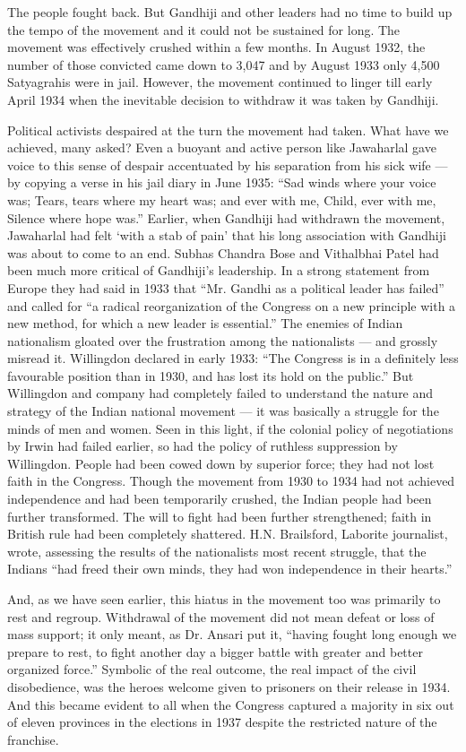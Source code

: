 \begin{multicols}{2}
The people fought back. But Gandhiji and other leaders had no time to build up the tempo of the movement and it could not be sustained for long. The movement was effectively crushed within a few months. In August 1932, the number of those convicted came down to 3,047 and by August 1933 only 4,500 Satyagrahis were in jail. However, the movement continued to linger till early April 1934 when the inevitable decision to withdraw it was taken by Gandhiji.

Political activists despaired at the turn the movement had taken. What have we achieved, many asked? Even a buoyant and active person like Jawaharlal gave voice to this sense of despair accentuated by his separation from his sick wife --- by copying a verse in his jail diary in June 1935: ``Sad winds where your voice was; Tears, tears where my heart was; and ever with me, Child, ever with me, Silence where hope was.'' Earlier, when Gandhiji had withdrawn the movement, Jawaharlal had felt `with a stab of pain' that his long association with Gandhiji was about to come to an end. Subhas Chandra Bose and Vithalbhai Patel had been much more critical of Gandhiji's leadership. In a strong statement from Europe they had said in 1933 that ``Mr. Gandhi as a political leader has failed'' and called for ``a radical reorganization of the Congress on a new principle with a new method, for which a new leader is essential.'' The enemies of Indian nationalism gloated over the frustration among the nationalists --- and grossly misread it. Willingdon declared in early 1933: ``The Congress is in a definitely less favourable position than in 1930, and has lost its hold on the public.'' But Willingdon and company had completely failed to understand the nature and strategy of the Indian national movement --- it was basically a struggle for the minds of men and women. Seen in this light, if the colonial policy of negotiations by Irwin had failed earlier, so had the policy of ruthless suppression by Willingdon. People had been cowed down by superior force; they had not lost faith in the Congress. Though the movement from 1930 to 1934 had not achieved independence and had been temporarily crushed, the Indian people had been further transformed. The will to fight had been further strengthened; faith in British rule had been completely shattered. H.N. Brailsford, Laborite journalist, wrote, assessing the results of the nationalists most recent struggle, that the Indians ``had freed their own minds, they had won independence in their hearts.''

And, as we have seen earlier, this hiatus in the movement too was primarily to rest and regroup. Withdrawal of the movement did not mean defeat or loss of mass support; it only meant, as Dr. Ansari put it, ``having fought long enough we prepare to rest, to fight another day a bigger battle with greater and better organized force.'' Symbolic of the real outcome, the real impact of the civil disobedience, was the heroes welcome given to prisoners on their release in 1934. And this became evident to all when the Congress captured a majority in six out of eleven provinces in the elections in 1937 despite the restricted nature of the franchise.


\end{multicols}

